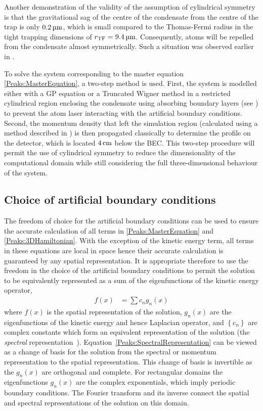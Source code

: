 Another demonstration of the validity of the assumption of cylindrical symmetry is that the gravitational sag of the centre of the condensate from the centre of the trap is only $\unit[0.2]{\micro m}$, which is small compared to the Thomas-Fermi radius in the tight trapping dimensions of $r_\text{TF} = \unit[9.4]{\micro m}$. Consequently, atoms will be repelled from the condensate almost symmetrically. Such a situation was observed earlier in .

To solve the system corresponding to the master equation \eqref{Peaks:MasterEquation}, a two-step method is used. First, the system is modelled either with a GP equation or a Truncated Wigner method in a restricted cylindrical region enclosing the condensate using absorbing boundary layers (see ) to prevent the atom laser interacting with the artificial boundary conditions. Second, the momentum density that left the simulation region (calculated using a method described in ) is then propagated classically to determine the profile on the detector, which is located $\unit[4]{cm}$ below the BEC. This two-step procedure will permit the use of cylindrical symmetry to reduce the dimensionality of the computational domain while still considering the full three-dimensional behaviour of the system.

\subsection{Choice of artificial boundary conditions}

The freedom of choice for the artificial boundary conditions can be used to ensure the accurate calculation of all terms in \eqref{Peaks:MasterEquation} and \eqref{Peaks:3DHamiltonian}. With the exception of the kinetic energy term, all terms in these equations are local in space hence their accurate calculation is guaranteed by any spatial representation. It is appropriate therefore to use the freedom in the choice of the artificial boundary conditions to permit the solution to be equivalently represented as a sum of the eigenfunctions of the kinetic energy operator,
\begin{align}
    \label{Peaks:SpectralRepresentation}
    f(x) &= \sum c_n g_n (x)
\end{align} 
where $f(x)$ is the spatial representation of the solution, $g_n(x)$ are the eigenfunctions of the kinetic energy and hence Laplacian operator, and $\left\{c_n\right\}$ are complex constants which form an equivalent representation of the solution (the \emph{spectral} representation~\citep{SpectralMethods}). Equation~\eqref{Peaks:SpectralRepresentation} can be viewed as a change of basis for the solution from the spectral or momentum representation to the spatial representation. This change of basis is invertible as the $g_n(x)$ are orthogonal and complete. For rectangular domains the eigenfunctions $g_n(x)$ are the complex exponentials, which imply periodic boundary conditions. The Fourier transform and its inverse connect the spatial and spectral representations of the solution on this domain.


